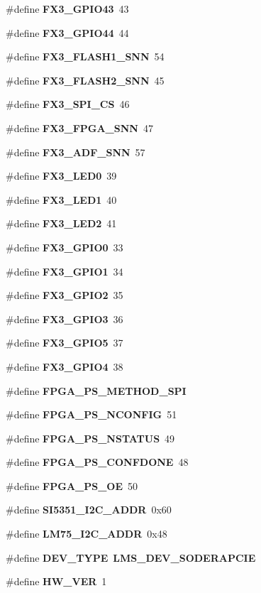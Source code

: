 \begin{DoxyCompactItemize}
\begin{DoxyCompactList}
 \end{DoxyCompactList}\item 
\#define {\bf F\+X3\+\_\+\+G\+P\+I\+O43}~43
\item 
\#define {\bf F\+X3\+\_\+\+G\+P\+I\+O44}~44
\item 
\#define {\bf F\+X3\+\_\+\+F\+L\+A\+S\+H1\+\_\+\+S\+NN}~54
\item 
\#define {\bf F\+X3\+\_\+\+F\+L\+A\+S\+H2\+\_\+\+S\+NN}~45
\item 
\#define {\bf F\+X3\+\_\+\+S\+P\+I\+\_\+\+CS}~46
\item 
\#define {\bf F\+X3\+\_\+\+F\+P\+G\+A\+\_\+\+S\+NN}~47
\item 
\#define {\bf F\+X3\+\_\+\+A\+D\+F\+\_\+\+S\+NN}~57
\item 
\#define {\bf F\+X3\+\_\+\+L\+E\+D0}~39
\item 
\#define {\bf F\+X3\+\_\+\+L\+E\+D1}~40
\item 
\#define {\bf F\+X3\+\_\+\+L\+E\+D2}~41
\item 
\#define {\bf F\+X3\+\_\+\+G\+P\+I\+O0}~33
\item 
\#define {\bf F\+X3\+\_\+\+G\+P\+I\+O1}~34
\item 
\#define {\bf F\+X3\+\_\+\+G\+P\+I\+O2}~35
\item 
\#define {\bf F\+X3\+\_\+\+G\+P\+I\+O3}~36
\item 
\#define {\bf F\+X3\+\_\+\+G\+P\+I\+O5}~37
\item 
\#define {\bf F\+X3\+\_\+\+G\+P\+I\+O4}~38
\item 
\#define {\bf F\+P\+G\+A\+\_\+\+P\+S\+\_\+\+M\+E\+T\+H\+O\+D\+\_\+\+S\+PI}
\item 
\#define {\bf F\+P\+G\+A\+\_\+\+P\+S\+\_\+\+N\+C\+O\+N\+F\+IG}~51
\item 
\#define {\bf F\+P\+G\+A\+\_\+\+P\+S\+\_\+\+N\+S\+T\+A\+T\+US}~49
\item 
\#define {\bf F\+P\+G\+A\+\_\+\+P\+S\+\_\+\+C\+O\+N\+F\+D\+O\+NE}~48
\item 
\#define {\bf F\+P\+G\+A\+\_\+\+P\+S\+\_\+\+OE}~50
\item 
\#define {\bf S\+I5351\+\_\+\+I2\+C\+\_\+\+A\+D\+DR}~0x60
\item 
\#define {\bf L\+M75\+\_\+\+I2\+C\+\_\+\+A\+D\+DR}~0x48
\item 
\#define {\bf D\+E\+V\+\_\+\+T\+Y\+PE}~{\bf L\+M\+S\+\_\+\+D\+E\+V\+\_\+\+S\+O\+D\+E\+R\+A\+P\+C\+IE}
\item 
\#define {\bf H\+W\+\_\+\+V\+ER}~1
\item 

\end{DoxyCompactItemize}
